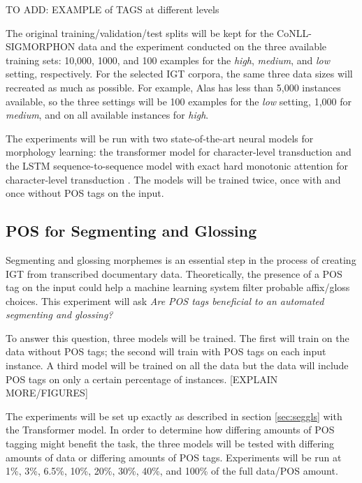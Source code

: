 TO ADD: EXAMPLE of TAGS at different levels

The original training/validation/test splits will be kept for the CoNLL-SIGMORPHON data and the experiment conducted on the three available training sets: 10,000, 1000, and 100 examples for the \textit{high}, \textit{medium}, and \textit{low} setting, respectively. For the selected IGT corpora, the same three data sizes will recreated as much as possible. For example, Alas has less than 5,000 instances available, so the three settings will be 100 examples for the \textit{low} setting, 1,000 for \textit{medium}, and on all available instances for \textit{high}.  

The experiments will be run with two state-of-the-art neural models for morphology learning: the transformer model for character-level transduction \citep{wu2020applying} and the LSTM sequence-to-sequence model with exact hard monotonic attention for character-level transduction \citep{wu-cotterell-2019-exact}.
The models will be trained twice, once with and once without POS tags on the input. 

\subsection{POS for Segmenting and Glossing}

Segmenting and glossing morphemes is an essential step in the process of creating IGT from transcribed documentary data. Theoretically, the presence of a POS tag on the input could help a machine learning system filter probable affix/gloss choices. This experiment will ask \textit{Are POS tags beneficial to an automated segmenting and glossing?} 

To answer this question, three models will be trained. The first will train on the data without POS tags; the second will train with POS tags on each input instance. A third model will be trained on all the data but the data will include POS tags on only a certain percentage of instances. [EXPLAIN MORE/FIGURES] 

The experiments will be set up exactly as described in section \ref{sec:seggls} with the Transformer model. In order to determine how differing amounts of POS tagging might benefit the task, the three models will be tested with differing amounts of data or differing amounts of POS tags. Experiments will be run at 1\%, 3\%, 6.5\%, 10\%, 20\%, 30\%, 40\%, and 100\% of the full data/POS amount. 

